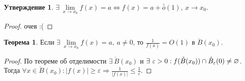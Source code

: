 \documentclass[a4paper, 12pt]{article}
\newcommand{\Bo}{\mathring{B}}
\renewcommand{\epsilon}{\varepsilon}
\renewcommand{\emptyset}{\varnothing}
\newcommand{\om}{\bar{\bar{o}}}
\theoremstyle{definition}
\newtheorem*{theorem}{Теорема}
\newtheorem*{statement}{Утверждение}
\begin{document}
        \begin{statement}
            $\exists\ \lim\limits_{x\to x_0}f(x)=a\Leftrightarrow f(x)=a+\om(1),\ x\to x_0$.
        \end{statement} 
        \begin{proof}
            очев :(
        \end{proof}
        \begin{theorem}
            Если $\exists\ \lim\limits_{x\to x_0}f(x)=a,\ a\ne 0$, то $\frac{1}{f(x)}=O(1)$ в $\Bo(x_0)$.
        \end{theorem} 
        \begin{proof}
            По теореме об отделимости $\exists\ \Bo(x_0)$ и $\exists\ \epsilon>0:\\
            f(\Bo(x_0))\cap \Bo_{\epsilon}(0)\ne \emptyset$. Тогда $\forall x\in \Bo(x_0): |f(x)|\geq \epsilon \Rightarrow \frac{1}{|f(x)|}\leq \frac{1}{\epsilon}$. 
        \end{proof} 
\end{document}
